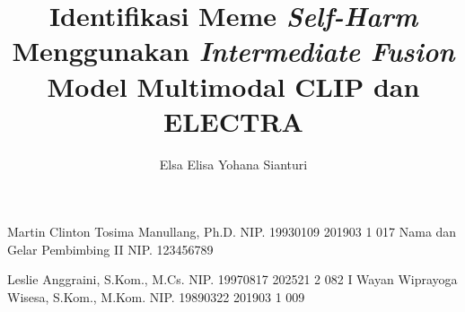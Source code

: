 \documentclass[article]{report} %
\begin{document}

    \title{Identifikasi Meme \textit{Self-Harm} Menggunakan \textit{Intermediate Fusion} Model Multimodal CLIP dan ELECTRA}

    \author{Elsa Elisa Yohana Sianturi}      %

    \dosbingA%
        {Martin Clinton Tosima Manullang, Ph.D.}%
        {NIP. 19930109 201903 1 017}              %
    \dosbingB%
        {Nama dan Gelar Pembimbing II}%
        {NIP. 123456789}                           %

    \pengujiA%
        {Leslie Anggraini, S.Kom., M.Cs.}%
        {NIP. 19970817 202521 2 082}              %
    \pengujiB%
        {I Wayan Wiprayoga Wisesa, S.Kom., M.Kom.}%
        {NIP. 19890322 201903 1 009}              %

    \sloppy %
    \setcounter{page}{1} %

    \clearpage
    \pagestyle{alternatingstyle}
    \tableofcontents
\end{document}
